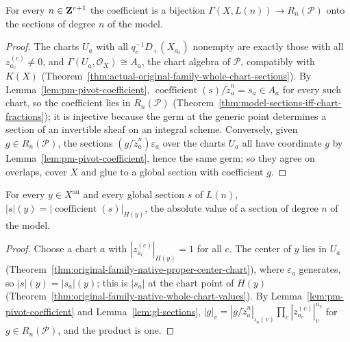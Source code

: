\begin{lemma}
\label{lem:pm-signed-sections}
\leanok
{}
For every $n\in\mathbf{Z}^{r+1}$ the coefficient is a bijection
$\Gamma(X,L(n))\to R_n(\mathcal P)$ onto the sections of degree $n$ of the model.
\end{lemma}
\begin{proof}
\leanok
The charts $U_a$ with all $q_c^{-1}D_+(X_{a_c})$ nonempty are exactly those with all
$z^{(c)}_{a_c}\neq0$, and $\Gamma(U_a,\mathcal O_X)\cong A_a$, the chart algebra of
$\mathcal P$, compatibly with $K(X)$
(Theorem~\ref{thm:actual-original-family-whole-chart-sections}). By
Lemma~\ref{lem:pm-pivot-coefficient}, $\operatorname{coefficient}(s)/\tilde z_a^n=s_a\in A_a$
for every such chart, so the coefficient lies in $R_n(\mathcal P)$
(Theorem~\ref{thm:model-sections-iff-chart-fractions}); it is injective because the germ at the
generic point determines a section of an invertible sheaf on an integral scheme. Conversely,
given $g\in R_n(\mathcal P)$, the sections $(g/\tilde z_a^n)\varepsilon_a$ over the charts
$U_a$ all have coordinate $g$ by Lemma~\ref{lem:pm-pivot-coefficient}, hence the same germ;
so they agree on overlaps, cover $X$ and glue to a global section with coefficient $g$.
\end{proof}

\begin{lemma}
\label{lem:pm-signed-norms}
\leanok
{}
For every $y\in X^{\mathrm{an}}$ and every global section $s$ of $L(n)$,
$|s|(y)=|\operatorname{coefficient}(s)|_{H(y)}$, the absolute value of a section of degree $n$
of the model.
\end{lemma}
\begin{proof}
\leanok
Choose a chart $a$ with $|z^{(c)}_{a_c}|_{H(y)}=1$ for all $c$. The center of $y$ lies in $U_a$
(Theorem~\ref{thm:original-family-native-proper-center-chart}), where $\varepsilon_a$ generates,
so $|s|(y)=|s_a|(y)$; this is $|s_a|$ at the chart point of $H(y)$
(Theorem~\ref{thm:original-family-native-whole-chart-values}). By
Lemma~\ref{lem:pm-pivot-coefficient} and Lemma~\ref{lem:gl-sections},
$|g|_v=|g/\tilde z_a^n|_{\iota_a(v)}\prod_c|z^{(c)}_{a_c}|_v^{n_c}$ for $g\in R_n(\mathcal P)$,
and the product is one.
\end{proof}

